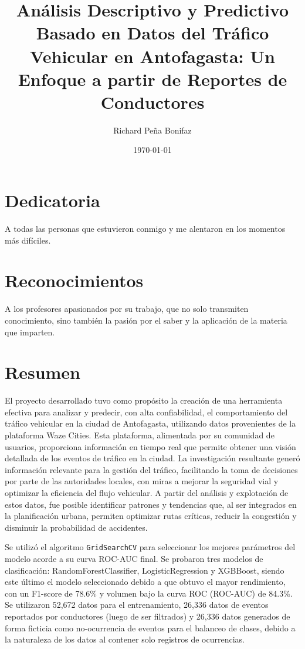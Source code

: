 \documentclass[12pt]{article}
\newcommand{\ttitle}{Análisis Descriptivo y Predictivo Basado en Datos del Tráfico Vehicular en Antofagasta: Un Enfoque a partir de Reportes de Conductores}
\newcommand{\auth}{Richard Peña Bonifaz}
\begin{document}

\title{\ttitle}
\author{\auth}
\date{\today}
\maketitle

\section*{Dedicatoria}

A todas las personas que estuvieron conmigo y me alentaron en los momentos más difíciles.

\section*{Reconocimientos}

A los profesores apasionados por su trabajo, que no solo transmiten conocimiento, sino también la pasión por el saber y la aplicación de la materia que imparten.

\newpage
\tableofcontents
\listoffigures
\listoftables
\newpage

\section{Resumen}

\setcounter{page}{1}

El proyecto desarrollado tuvo como propósito la creación de una herramienta efectiva para analizar y predecir, con alta confiabilidad, el comportamiento del tráfico vehicular en la ciudad de Antofagasta, utilizando datos provenientes de la plataforma Waze Cities. Esta plataforma, alimentada por su comunidad de usuarios, proporciona información en tiempo real que permite obtener una visión detallada de los eventos de tráfico en la ciudad. La investigación resultante generó información relevante para la gestión del tráfico, facilitando la toma de decisiones por parte de las autoridades locales, con miras a mejorar la seguridad vial y optimizar la eficiencia del flujo vehicular. A partir del análisis y explotación de estos datos, fue posible identificar patrones y tendencias que, al ser integrados en la planificación urbana, permiten optimizar rutas críticas, reducir la congestión y disminuir la probabilidad de accidentes.

Se utilizó el algoritmo \texttt{GridSearchCV} para seleccionar los mejores parámetros del modelo acorde a su curva ROC-AUC final. Se probaron tres modelos de clasificación: RandomForestClassifier, LogisticRegression y XGBBoost, siendo este último el modelo seleccionado debido a que obtuvo el mayor rendimiento, con un F1-score de 78.6\% y volumen bajo la curva ROC (ROC-AUC) de 84.3\%. Se utilizaron 52,672 datos para el entrenamiento, 26,336 datos de eventos reportados por conductores (luego de ser filtrados) y 26,336 datos generados de forma ficticia como no-ocurrencia de eventos para el balanceo de clases, debido a la naturaleza de los datos al contener solo registros de ocurrencias.
\end{document}
